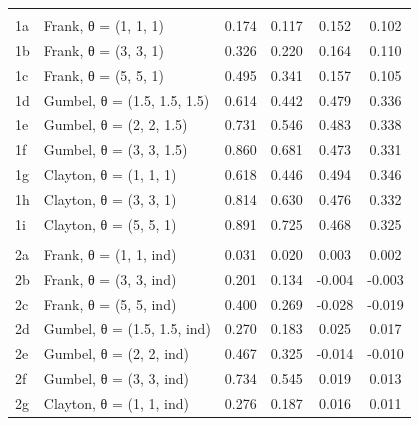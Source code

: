\documentclass[
]{article}
\begin{document}
\begin{longtable}[t]{llcccc}
\endfoot
\bottomrule
\endlastfoot
\addlinespace[0.3em]
\multicolumn{6}{l}{\textbf{Scenario 1: (+, +, +)}}\\
\hspace{1em}1a & Frank, θ = (1, 1, 1) & 0.174 & 0.117 & 0.152 & 0.102\\
\hspace{1em}1b & Frank, θ = (3, 3, 1) & 0.326 & 0.220 & 0.164 & 0.110\\
\hspace{1em}1c & Frank, θ = (5, 5, 1) & 0.495 & 0.341 & 0.157 & 0.105\\
\hspace{1em}1d & Gumbel, θ = (1.5, 1.5, 1.5) & 0.614 & 0.442 & 0.479 & 0.336\\
\hspace{1em}1e & Gumbel, θ = (2, 2, 1.5) & 0.731 & 0.546 & 0.483 & 0.338\\
\hspace{1em}1f & Gumbel, θ = (3, 3, 1.5) & 0.860 & 0.681 & 0.473 & 0.331\\
\hspace{1em}1g & Clayton, θ = (1, 1, 1) & 0.618 & 0.446 & 0.494 & 0.346\\
\hspace{1em}1h & Clayton, θ = (3, 3, 1) & 0.814 & 0.630 & 0.476 & 0.332\\
\hspace{1em}1i & Clayton, θ = (5, 5, 1) & 0.891 & 0.725 & 0.468 & 0.325\\
\addlinespace[0.3em]
\multicolumn{6}{l}{\textbf{Scenario 2: (+, +, ind)}}\\
\hspace{1em}2a & Frank, θ = (1, 1, ind) & 0.031 & 0.020 & 0.003 & 0.002\\
\hspace{1em}2b & Frank, θ = (3, 3, ind) & 0.201 & 0.134 & -0.004 & -0.003\\
\hspace{1em}2c & Frank, θ = (5, 5, ind) & 0.400 & 0.269 & -0.028 & -0.019\\
\hspace{1em}2d & Gumbel, θ = (1.5, 1.5, ind) & 0.270 & 0.183 & 0.025 & 0.017\\
\hspace{1em}2e & Gumbel, θ = (2, 2, ind) & 0.467 & 0.325 & -0.014 & -0.010\\
\hspace{1em}2f & Gumbel, θ = (3, 3, ind) & 0.734 & 0.545 & 0.019 & 0.013\\
\hspace{1em}2g & Clayton, θ = (1, 1, ind) & 0.276 & 0.187 & 0.016 & 0.011\\

\end{longtable}
\end{document}
